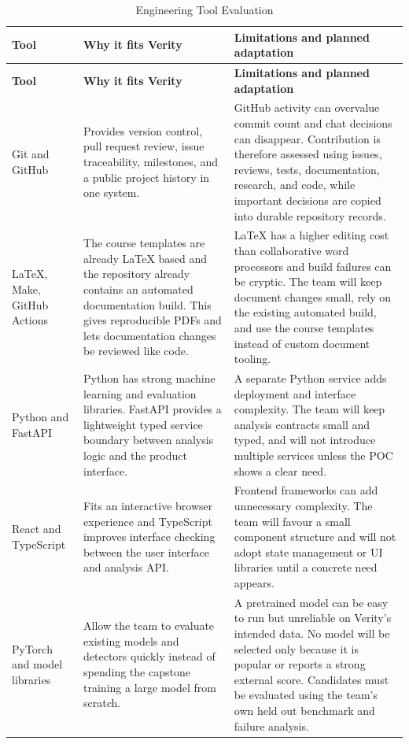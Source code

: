 \documentclass{article}
\begin{document}
\small
\begin{longtable}{>{\raggedright\arraybackslash}p{}>{\raggedright\arraybackslash}p{}>{\raggedright\arraybackslash}p{}}
\caption{Engineering Tool Evaluation}\\
\toprule
\textbf{Tool} & \textbf{Why it fits Verity} & \textbf{Limitations and planned adaptation}\\
\midrule
\endfirsthead
\toprule
\textbf{Tool} & \textbf{Why it fits Verity} & \textbf{Limitations and planned adaptation}\\
\midrule
\endhead
Git and GitHub & Provides version control, pull request review, issue traceability, milestones, and a public project history in one system. & GitHub activity can overvalue commit count and chat decisions can disappear. Contribution is therefore assessed using issues, reviews, tests, documentation, research, and code, while important decisions are copied into durable repository records.\\
\addlinespace
LaTeX, Make, GitHub Actions & The course templates are already LaTeX based and the repository already contains an automated documentation build. This gives reproducible PDFs and lets documentation changes be reviewed like code. & LaTeX has a higher editing cost than collaborative word processors and build failures can be cryptic. The team will keep document changes small, rely on the existing automated build, and use the course templates instead of custom document tooling.\\
\addlinespace
Python and FastAPI & Python has strong machine learning and evaluation libraries. FastAPI provides a lightweight typed service boundary between analysis logic and the product interface. & A separate Python service adds deployment and interface complexity. The team will keep analysis contracts small and typed, and will not introduce multiple services unless the POC shows a clear need.\\
\addlinespace
React and TypeScript & Fits an interactive browser experience and TypeScript improves interface checking between the user interface and analysis API. & Frontend frameworks can add unnecessary complexity. The team will favour a small component structure and will not adopt state management or UI libraries until a concrete need appears.\\
\addlinespace
PyTorch and model libraries & Allow the team to evaluate existing models and detectors quickly instead of spending the capstone training a large model from scratch. & A pretrained model can be easy to run but unreliable on Verity's intended data. No model will be selected only because it is popular or reports a strong external score. Candidates must be evaluated using the team's own held out benchmark and failure analysis.\\

\end{longtable}
\end{document}

